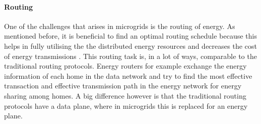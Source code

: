 \paragraph{Routing}
One of the challenges that arises in microgrids is the routing of energy. As mentioned before, it is beneficial to find an optimal routing schedule because this helps in fully utilising the the distributed energy resources and decreases the cost of energy transmissions \cite{HongKim2016}. This routing task is, in a lot of ways, comparable to the traditional routing protocols. Energy routers for example exchange the energy information of each home in the data network and try to find the most effective transaction and effective transmission path in the energy network for energy sharing among homes. \cite{YoonKimChang2013} A big difference however is that the traditional routing protocols have a data plane, where in microgrids this is replaced for an energy plane.